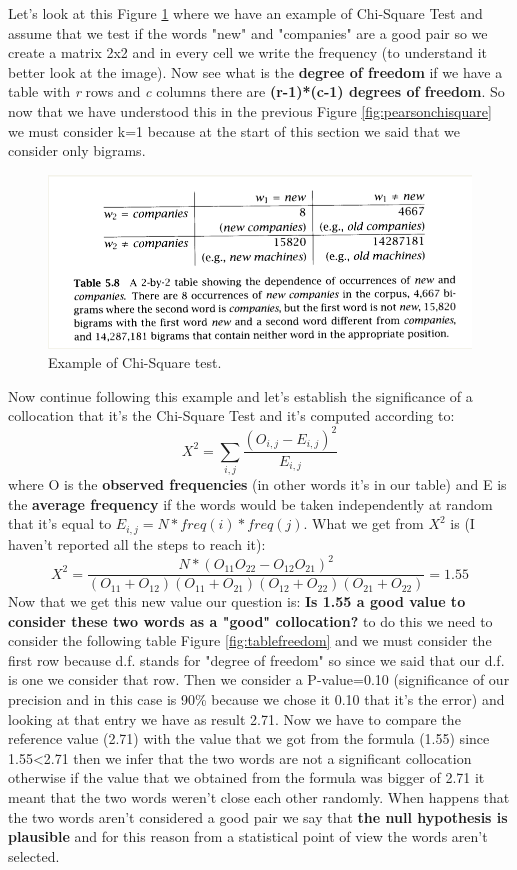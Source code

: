Let's look at this Figure \ref{fig:examplechisquare} where we have an example of Chi-Square Test and assume that we test if the words "new" and "companies" are a good pair so we create a matrix 2x2 and in every cell we write the frequency (to understand it better look at the image). Now see what is the \textbf{degree of freedom} if we have a table with \textit{r} rows and \textit{c} columns there are \textbf{(r-1)*(c-1) degrees of freedom}. So now that we have understood this in the previous Figure \ref{fig:pearsonchisquare} we must consider k=1 because at the start of this section we said that we consider only bigrams.\newline
\begin{figure}
    \centering
    \includegraphics[width=0.75\linewidth]{images/examplechisquare.png}
    \caption{Example of Chi-Square test.}
    \label{fig:examplechisquare}
\end{figure}
Now continue following this example and let's establish the significance of a collocation that it's the Chi-Square Test and it's computed according to:
\begin{equation}
    X^2=\sum_{i,j}\frac{(O_{i,j}-E_{i,j})^2}{E_{i,j}}
\end{equation}
where O is the \textbf{observed frequencies} (in other words it's in our table) and E is the \textbf{average frequency} if the words would be taken independently at random that it's equal to $E_{i,j}=N*freq(i)*freq(j)$.\newline
What we get from $X^2$ is (I haven't reported all the steps to reach it):
\begin{equation}
    X^2=\frac{N*(O_{11}O_{22}-O_{12}O_{21})^2}{(O_{11}+O_{12})(O_{11}+O_{21})(O_{12}+O_{22})(O_{21}+O_{22})}=1.55
\end{equation}
Now that we get this new value our question is: \textbf{Is 1.55 a good value to consider these two words as a "good" collocation?} to do this we need to consider the following table Figure \ref{fig:tablefreedom} and we must consider the first row because d.f. stands for "degree of freedom" so since we said that our d.f. is one we consider that row. Then we consider a P-value=0.10 (significance of our precision and in this case is 90\% because we chose it 0.10 that it's the error) and looking at that entry we have as result 2.71. Now we have to compare the reference value (2.71) with the value that we got from the formula (1.55) since 1.55<2.71 then we infer that the two words are not a significant collocation otherwise if the value that we obtained from the formula was bigger of 2.71 it meant that the two words weren't close each other randomly. When happens that the two words aren't considered a good pair we say that \textbf{the null hypothesis is plausible} and for this reason from a statistical point of view the words aren't selected.\newline
